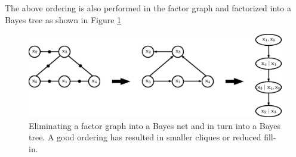 The above ordering is also performed in the factor graph and factorized into a Bayes tree as shown in Figure \ref{fig:good_ordering_graph}
\begin{figure}[H]
\centering
\includegraphics[width=\textwidth]{Chapters/figures2/good_ordering}
\caption{Eliminating a factor graph into a Bayes net and in turn into a Bayes tree. A good ordering has resulted in smaller cliques or reduced fill-in.}
\label{fig:good_ordering_graph}
\end{figure}
